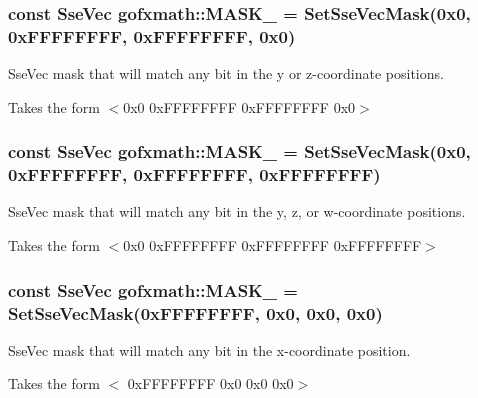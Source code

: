 \subsubsection[{M\+A\+S\+K\+\_\+0110}]{\setlength{\rightskip}{0pt plus 5cm}const {\bf Sse\+Vec} gofxmath\+::\+M\+A\+S\+K\+\_ = {\bf Set\+Sse\+Vec\+Mask}(0x0, 0x\+F\+F\+F\+F\+F\+F\+F\+F, 0x\+F\+F\+F\+F\+F\+F\+F\+F, 0x0)}\label{namespacegofxmath_af23b97e8acce0ac2474bef3510e8dea3}


Sse\+Vec mask that will match any bit in the y or z-\/coordinate positions. 

Takes the form $<$0x0 0x\+F\+F\+F\+F\+F\+F\+F\+F 0x\+F\+F\+F\+F\+F\+F\+F\+F 0x0$>$ \hypertarget{namespacegofxmath_a26899473d5a93ecf33fbdeb7bf332890}{}
\subsubsection[{M\+A\+S\+K\+\_\+0111}]{\setlength{\rightskip}{0pt plus 5cm}const {\bf Sse\+Vec} gofxmath\+::\+M\+A\+S\+K\+\_ = {\bf Set\+Sse\+Vec\+Mask}(0x0, 0x\+F\+F\+F\+F\+F\+F\+F\+F, 0x\+F\+F\+F\+F\+F\+F\+F\+F, 0x\+F\+F\+F\+F\+F\+F\+F\+F)}\label{namespacegofxmath_a26899473d5a93ecf33fbdeb7bf332890}


Sse\+Vec mask that will match any bit in the y, z, or w-\/coordinate positions. 

Takes the form $<$0x0 0x\+F\+F\+F\+F\+F\+F\+F\+F 0x\+F\+F\+F\+F\+F\+F\+F\+F 0x\+F\+F\+F\+F\+F\+F\+F\+F$>$ \hypertarget{namespacegofxmath_a47a55dbc42a84afc2fc369f8d87605d1}{}
\subsubsection[{M\+A\+S\+K\+\_\+1000}]{\setlength{\rightskip}{0pt plus 5cm}const {\bf Sse\+Vec} gofxmath\+::\+M\+A\+S\+K\+\_ = {\bf Set\+Sse\+Vec\+Mask}(0x\+F\+F\+F\+F\+F\+F\+F\+F, 0x0, 0x0, 0x0)}\label{namespacegofxmath_a47a55dbc42a84afc2fc369f8d87605d1}


Sse\+Vec mask that will match any bit in the x-\/coordinate position. 

Takes the form $<$ 0x\+F\+F\+F\+F\+F\+F\+F\+F 0x0 0x0 0x0$>$ \hypertarget{namespacegofxmath_a689cc233b7fa8e315c8cc38f474677df}{}
